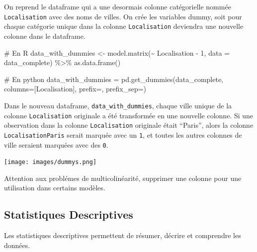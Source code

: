 \documentclass[
  letterpaper,
  DIV=11,
  numbers=noendperiod]{scrartcl}
\newenvironment{Shaded}{\begin{snugshade}}{\end{snugshade}}
\newcommand{\AttributeTok}[1]{\textcolor[rgb]{0.40,0.45,0.13}{#1}}
\newcommand{\CommentTok}[1]{\textcolor[rgb]{0.37,0.37,0.37}{#1}}
\newcommand{\DecValTok}[1]{\textcolor[rgb]{0.68,0.00,0.00}{#1}}
\newcommand{\FunctionTok}[1]{\textcolor[rgb]{0.28,0.35,0.67}{#1}}
\newcommand{\NormalTok}[1]{\textcolor[rgb]{0.00,0.23,0.31}{#1}}
\newcommand{\OtherTok}[1]{\textcolor[rgb]{0.00,0.23,0.31}{#1}}
\newcommand{\SpecialCharTok}[1]{\textcolor[rgb]{0.37,0.37,0.37}{#1}}
\newcommand{\StringTok}[1]{\textcolor[rgb]{0.13,0.47,0.30}{#1}}
\begin{document}
On reprend le dataframe qui a une desormais colonne catégorielle nommée
\texttt{Localisation} avec des noms de villes. On crée les variables
dummy, soit pour chaque catégorie unique dans la colonne
\texttt{Localisation} deviendra une nouvelle colonne dans le dataframe.

\begin{Shaded}
\begin{Highlighting}[]
\CommentTok{\# En R}
\NormalTok{data\_with\_dummies }\OtherTok{\textless{}{-}} \FunctionTok{model.matrix}\NormalTok{(}\SpecialCharTok{\textasciitilde{}}\NormalTok{ Localisation }\SpecialCharTok{{-}} \DecValTok{1}\NormalTok{, }\AttributeTok{data =}\NormalTok{ data\_complete) }\SpecialCharTok{\%\textgreater{}\%} 
                     \FunctionTok{as.data.frame}\NormalTok{()}
\end{Highlighting}
\end{Shaded}

\begin{Shaded}
\begin{Highlighting}[]
\CommentTok{\# En python}
\NormalTok{data\_with\_dummies }\OtherTok{=} \FunctionTok{pd.get\_dummies}\NormalTok{(data\_complete, }\AttributeTok{columns=}\NormalTok{[}\StringTok{\textquotesingle{}Localisation\textquotesingle{}}\NormalTok{], }\AttributeTok{prefix=}\StringTok{\textquotesingle{}\textquotesingle{}}\NormalTok{, }\AttributeTok{prefix\_sep=}\StringTok{\textquotesingle{}\textquotesingle{}}\NormalTok{)}
\end{Highlighting}
\end{Shaded}

Dans le nouveau dataframe, \texttt{data\_with\_dummies}, chaque ville
unique de la colonne \texttt{Localisation} originale a été transformée
en une nouvelle colonne. Si une observation dans la colonne
\texttt{Localisation} originale était ``Paris'', alors la colonne
\texttt{LocalisationParis} serait marquée avec un \texttt{1}, et toutes
les autres colonnes de ville seraient marquées avec des \texttt{0}.

\texttt{[image: images/dummys.png]}

Attention aux problémes de multicolinéarité, supprimer une colonne pour
une utilisation dans certains modèles.

\subsection{Statistiques Descriptives}\label{statistiques-descriptives}

Les statistiques descriptives permettent de résumer, décrire et
comprendre les données.
\end{document}
